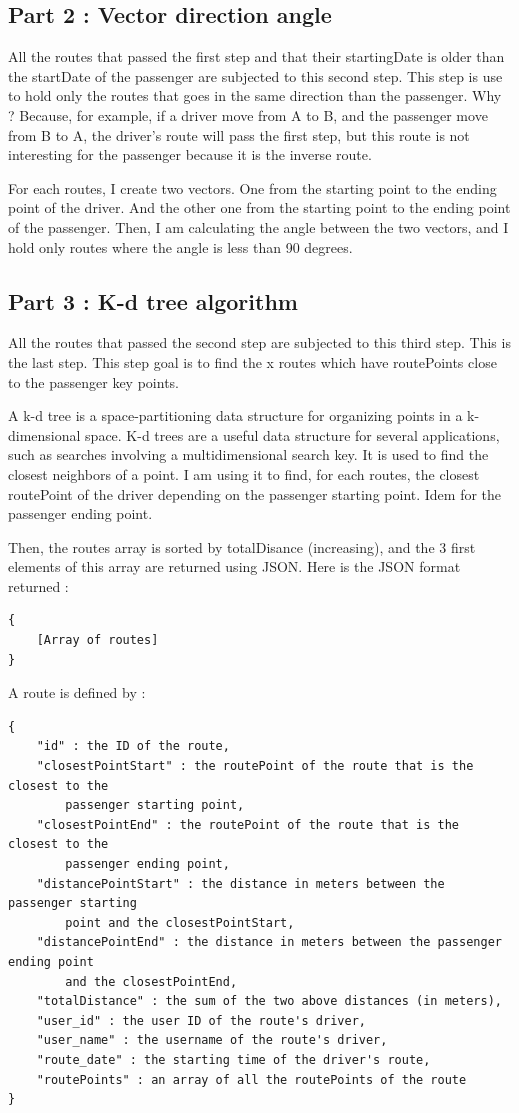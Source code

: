 \subsection{Part 2 : Vector direction angle}

All the routes that passed the first step and that their startingDate is older than the startDate of the passenger are subjected to this second step. This step is use to hold only the routes that goes in the same direction than the passenger. Why ? Because, for example, if a driver move from A to B, and the passenger move from B to A, the driver's route will pass the first step, but this route is not interesting for the passenger because it is the inverse route.

For each routes, I create two vectors. One from the starting point to the ending point of the driver. 
And the other one from the starting point to the ending point of the passenger.
Then, I am calculating the angle between the two vectors, and I hold only routes where the angle is less than 90 degrees.

\subsection{Part 3 : K-d tree algorithm}

All the routes that passed the second step are subjected to this third step. This is the last step. This step goal is to find the x routes which have routePoints close to the passenger key points.

A k-d tree is a space-partitioning data structure for organizing points in a k-dimensional space.
K-d trees are a useful data structure for several applications, such as searches involving a multidimensional search key. It is used to find the closest neighbors
of a point. I am using it to find, for each routes, the closest routePoint of the driver depending on the passenger starting point. Idem for the passenger ending point.

Then, the routes array is sorted by totalDisance (increasing), and the 3 first elements of this array are returned using JSON. Here is the JSON format returned :

\begin{lstlisting}[style=DOS]
{
	[Array of routes]
}
\end{lstlisting}

A route is defined by :
\begin{lstlisting}[style=DOS]
{
	"id" : the ID of the route,
	"closestPointStart" : the routePoint of the route that is the closest to the
		passenger starting point,
	"closestPointEnd" : the routePoint of the route that is the closest to the 
		passenger ending point,
	"distancePointStart" : the distance in meters between the passenger starting 
		point and the closestPointStart,
	"distancePointEnd" : the distance in meters between the passenger ending point
		and the closestPointEnd,
	"totalDistance" : the sum of the two above distances (in meters),
	"user_id" : the user ID of the route's driver,
	"user_name" : the username of the route's driver,
	"route_date" : the starting time of the driver's route,
	"routePoints" : an array of all the routePoints of the route
}
\end{lstlisting}

